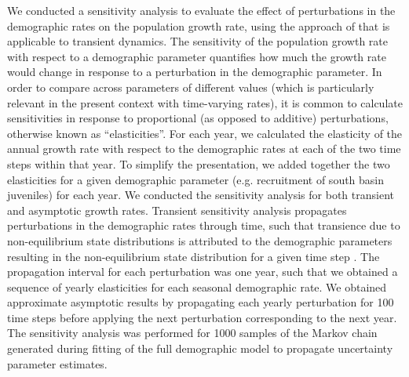 \documentclass[11pt]{article}
\begin{document}
{We conducted a sensitivity analysis to evaluate the effect of perturbations 
in the demographic rates on the population growth rate, 
using the approach of \cite{caswell2007sensitivity} 
that is applicable to transient dynamics. 
The sensitivity of the population growth rate with respect to a demographic parameter
quantifies how much the growth rate would change in response to a perturbation in the 
demographic parameter. 
In order to compare across parameters of different values 
(which is particularly relevant in the present context with time-varying rates),
it is common to calculate sensitivities 
in response to proportional (as opposed to additive) perturbations,
otherwise known as ``elasticities''.
For each year, we calculated the elasticity of the annual growth rate with respect
to the demographic rates at each of the two time steps within that year.
To simplify the presentation, 
we added together the two elasticities for a given demographic parameter 
(e.g. recruitment of south basin juveniles) for each year.
We conducted the sensitivity analysis for both transient and asymptotic growth rates.
Transient sensitivity analysis propagates perturbations in the demographic rates 
through time, 
such that transience due to non-equilibrium state distributions is attributed to the
demographic parameters resulting in the non-equilibrium state distribution 
for a given time step
\citep[][relevant equations are reproduced in Appendix III]{caswell2007sensitivity}.
The propagation interval for each perturbation was one year, 
such that we obtained a sequence of yearly elasticities 
for each seasonal demographic rate.
We obtained approximate asymptotic results by propagating each yearly perturbation
for 100 time steps before applying the next perturbation corresponding to the next year.
The sensitivity analysis was performed for 1000 samples of the Markov chain generated 
during fitting of the full demographic model to propagate uncertainty parameter estimates.






}
\end{document}
